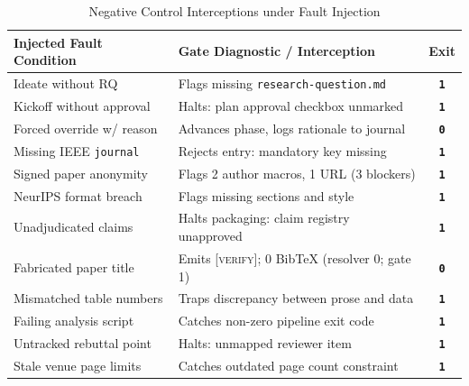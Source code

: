 \documentclass[conference]{IEEEtran}
\newcommand{\codeexit}[1]{\textbf{\texttt{#1}}}
\begin{document}
\begin{table}[t]
\centering
\caption{Negative Control Interceptions under Fault Injection}
\label{tab:neg}
\renewcommand{\arraystretch}{0.88}
\setlength{\tabcolsep}{2.5pt}
\scriptsize
\begin{tabular}{@{} >{\raggedright\arraybackslash}p{2.65cm} >{\raggedright\arraybackslash}p{4.25cm} c @{}}
\toprule
\textbf{Injected Fault Condition} & \textbf{Gate Diagnostic / Interception} & \textbf{Exit} \\
\midrule
\rowcolor{rowtint} Ideate without RQ & Flags missing \texttt{research-question.md} & \textcolor{gatered}{\codeexit{1}} \\
Kickoff without approval & Halts: plan approval checkbox unmarked & \textcolor{gatered}{\codeexit{1}} \\
\rowcolor{rowtint} Forced override w/ reason & Advances phase, logs rationale to journal & \textcolor{gategreen}{\codeexit{0}} \\
Missing IEEE \texttt{journal} & Rejects entry: mandatory key missing & \textcolor{gatered}{\codeexit{1}} \\
\rowcolor{rowtint} Signed paper anonymity & Flags 2 author macros, 1 URL (3 blockers) & \textcolor{gatered}{\codeexit{1}} \\
NeurIPS format breach & Flags missing sections and style & \textcolor{gatered}{\codeexit{1}} \\
\rowcolor{rowtint} Unadjudicated claims & Halts packaging: claim registry unapproved & \textcolor{gatered}{\codeexit{1}} \\
Fabricated paper title & Emits \textsc{[verify]}; 0 BibTeX (resolver 0; gate 1) & \textcolor{gategreen}{\codeexit{0}} \\
\rowcolor{rowtint} Mismatched table numbers & Traps discrepancy between prose and data & \textcolor{gatered}{\codeexit{1}} \\
Failing analysis script & Catches non-zero pipeline exit code & \textcolor{gatered}{\codeexit{1}} \\
\rowcolor{rowtint} Untracked rebuttal point & Halts: unmapped reviewer item & \textcolor{gatered}{\codeexit{1}} \\
Stale venue page limits & Catches outdated page count constraint & \textcolor{gatered}{\codeexit{1}} \\
\bottomrule
\end{tabular}
\end{table}
\end{document}
